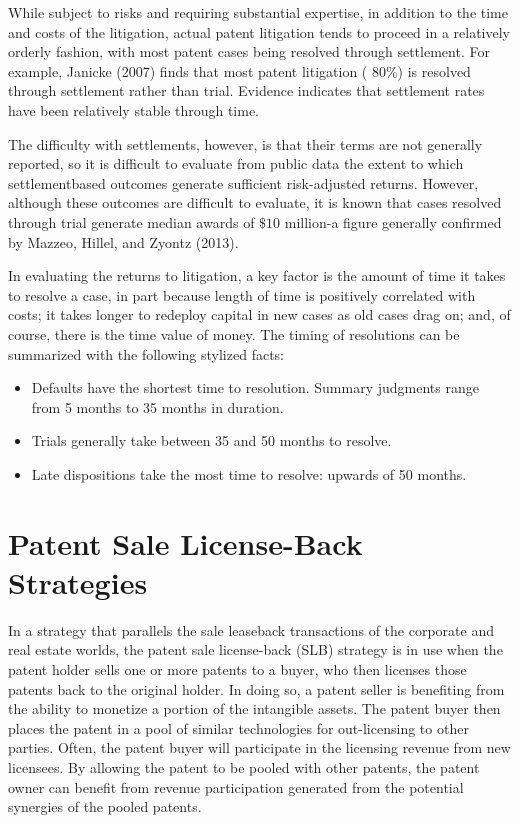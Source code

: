 \documentclass[11pt]{article}
\begin{document}
While subject to risks and requiring substantial expertise, in addition to the time and costs of the litigation, actual patent litigation tends to proceed in a relatively orderly fashion, with most patent cases being resolved through settlement. For example, Janicke (2007) finds that most patent litigation ( 80\%) is resolved through settlement rather than trial. Evidence indicates that settlement rates have been relatively stable through time.

The difficulty with settlements, however, is that their terms are not generally reported, so it is difficult to evaluate from public data the extent to which settlementbased outcomes generate sufficient risk-adjusted returns. However, although these outcomes are difficult to evaluate, it is known that cases resolved through trial generate median awards of $\$ 10$ million-a figure generally confirmed by Mazzeo, Hillel, and Zyontz (2013).

In evaluating the returns to litigation, a key factor is the amount of time it takes to resolve a case, in part because length of time is positively correlated with costs; it takes longer to redeploy capital in new cases as old cases drag on; and, of course, there is the time value of money. The timing of resolutions can be summarized with the following stylized facts:

\begin{itemize}
  \item Defaults have the shortest time to resolution. Summary judgments range from 5 months to 35 months in duration.
  \item Trials generally take between 35 and 50 months to resolve.
  \item Late dispositions take the most time to resolve: upwards of 50 months.
\end{itemize}

\section*{Patent Sale License-Back Strategies}
In a strategy that parallels the sale leaseback transactions of the corporate and real estate worlds, the patent sale license-back (SLB) strategy is in use when the patent holder sells one or more patents to a buyer, who then licenses those patents back to the original holder. In doing so, a patent seller is benefiting from the ability to monetize a portion of the intangible assets. The patent buyer then places the patent in a pool of similar technologies for out-licensing to other parties. Often, the patent buyer will participate in the licensing revenue from new licensees. By allowing the patent to be pooled with other patents, the patent owner can benefit from revenue participation generated from the potential synergies of the pooled patents.
\end{document}
